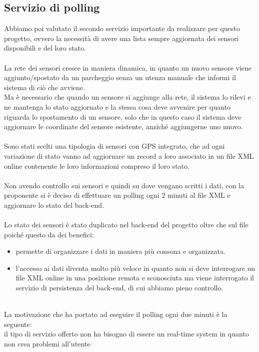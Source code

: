 \subsection{Servizio di polling}
Abbiamo poi valutato il secondo servizio importante da realizzare per questo progetto, ovvero
la necessità di avere una lista sempre aggiornata dei sensori disponibili e del loro stato.
\\\\
La rete dei sensori cresce in maniera dinamica, in quanto un nuovo sensore viene aggiunto/spostato
da un parcheggio senza un utenza manuale che informi il sistema di ciò che avviene. 
\\
Ma è necessario che quando un sensore si aggiunge alla rete, il sistema lo rilevi e ne mantenga lo stato
aggiornato e la stessa cosa deve avvenire per quanto riguarda lo spostamento di un sensore, solo che in 
questo caso il sistema deve aggiornare le coordinate del sensore esistente, anziché aggiungerne uno nuovo.
\\\\
Sono stati scelti una tipologia di sensori con GPS integrato, che ad ogni variazione di stato vanno ad 
aggiornare un record a loro associato in un file XML online contenente le loro informazioni compreso 
il loro stato.
\\\\
Non avendo controllo sui sensori e quindi su dove vengano scritti i dati, con la proponente si è deciso
di effettuare un polling ogni 2 minuti al file XML e aggiornare lo stato del back-end.
\\\\
Lo stato dei sensori è stato duplicato nel back-end del progetto oltre che sul file poiché questo da dei
benefici:
\begin{itemize}
    \item permette di organizzare i dati in maniera più consona e organizzata.
    \item l'accesso ai dati diventa molto più veloce in quanto non si deve interrogare un file XML online
        in una posizione remota e sconosciuta ma viene interrogato il servizio di persistenza del back-end, 
        di cui abbiamo pieno controllo.
\end{itemize}
\leavevmode\newline
\\
La motivazione che ha portato ad eseguire il polling ogni due minuti è la seguente:
\\
il tipo di servizio offerto non ha bisogno di essere un real-time system in quanto non crea problemi all'utente
